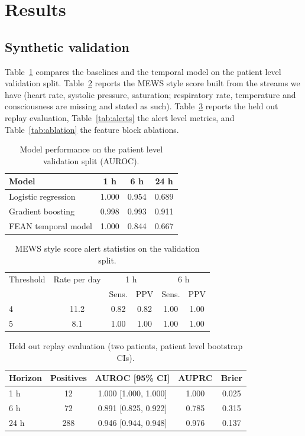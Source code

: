 \documentclass[11pt]{article}
\begin{document}
\section{Results}

\subsection{Synthetic validation}
Table~\ref{tab:baselines} compares the baselines and the temporal model on the
patient level validation split. Table~\ref{tab:mews} reports the MEWS style score
built from the streams we have (heart rate, systolic pressure, saturation;
respiratory rate, temperature and consciousness are missing and stated as such).
Table~\ref{tab:replay} reports the held out replay evaluation, Table~\ref{tab:alerts}
the alert level metrics, and Table~\ref{tab:ablation} the feature block ablations.

\begin{table}[t]
\centering
\caption{Model performance on the patient level validation split (AUROC).}
\label{tab:baselines}
\begin{tabular}{lccc}
\toprule
Model & 1 h & 6 h & 24 h \\
\midrule
Logistic regression & 1.000 & 0.954 & 0.689 \\
Gradient boosting & 0.998 & 0.993 & 0.911 \\
FEAN temporal model & 1.000 & 0.844 & 0.667 \\
\bottomrule
\end{tabular}
\end{table}

\begin{table}[t]
\centering
\caption{MEWS style score alert statistics on the validation split.}
\label{tab:mews}
\begin{tabular}{lccccc}
\toprule
Threshold & Rate per day & \multicolumn{2}{c}{1 h} & \multicolumn{2}{c}{6 h} \\
 & & Sens. & PPV & Sens. & PPV \\
\midrule
4 & 11.2 & 0.82 & 0.82 & 1.00 & 1.00 \\
5 & 8.1 & 1.00 & 1.00 & 1.00 & 1.00 \\
\bottomrule
\end{tabular}
\end{table}

\begin{table}[t]
\centering
\caption{Held out replay evaluation (two patients, patient level bootstrap CIs).}
\label{tab:replay}
\begin{tabular}{lcccc}
\toprule
Horizon & Positives & AUROC [95\% CI] & AUPRC & Brier \\
\midrule
1 h & 12 & 1.000 [1.000, 1.000] & 1.000 & 0.025 \\
6 h & 72 & 0.891 [0.825, 0.922] & 0.785 & 0.315 \\
24 h & 288 & 0.946 [0.944, 0.948] & 0.976 & 0.137 \\
\bottomrule
\end{tabular}
\end{table}
\end{document}
